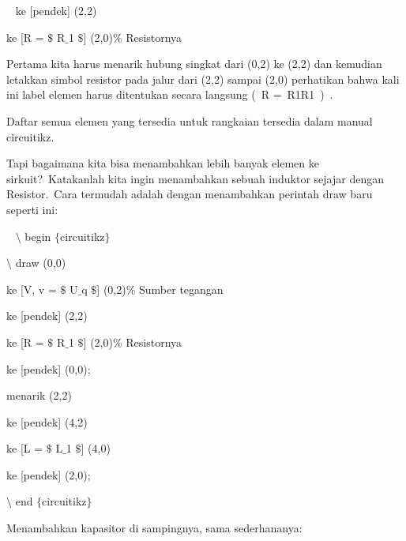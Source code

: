 \noindent 
~ ke [pendek] (2,2)
\par


\noindent 
 ke [R = $\$$ R$ \_ $1 $\$$] (2,0)$\%$ Resistornya 
\par


\noindent 
Pertama kita harus menarik hubung singkat dari (0,2) ke (2,2) dan kemudian letakkan simbol resistor pada jalur dari (2,2) sampai (2,0) perhatikan bahwa kali ini label elemen harus ditentukan secara langsung ( R = R1R1 ) .
\par


\noindent 
Daftar semua elemen yang tersedia untuk rangkaian tersedia dalam manual circuitikz.
\par


\noindent 
Tapi bagaimana kita bisa menambahkan lebih banyak elemen ke sirkuit? Katakanlah kita ingin menambahkan sebuah induktor sejajar dengan Resistor. Cara termudah adalah dengan menambahkan perintah draw baru seperti ini:
\par


\noindent 
~ $\setminus$ begin $ \{ $circuitikz$ \} $
\par


\noindent 
 $\setminus$ draw (0,0)
\par


\noindent 
 ke [V, v = $\$$ U$ \_ $q $\$$] (0,2)$\%$ Sumber tegangan
\par


\noindent 
 ke [pendek] (2,2)
\par


\noindent 
 ke [R = $\$$ R$ \_ $1 $\$$] (2,0)$\%$ Resistornya
\par


\noindent 
 ke [pendek] (0,0);
\par


\noindent 
 menarik (2,2)
\par


\noindent 
 ke [pendek] (4,2)
\par


\noindent 
 ke [L = $\$$ L$ \_ $1 $\$$] (4,0)
\par


\noindent 
 ke [pendek] (2,0);
\par


\noindent 
 $\setminus$ end $ \{ $circuitikz$ \} $ 
\par


\noindent 
Menambahkan kapasitor di sampingnya, sama sederhananya:
\par


